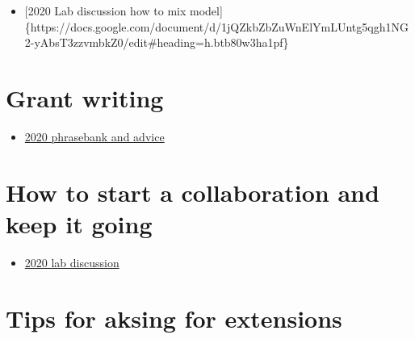 \documentclass[
  letterpaper,
  DIV=11,
  numbers=noendperiod]{scrreprt}
\providecommand{\tightlist}{%
  \setlength{\itemsep}{0pt}\setlength{\parskip}{0pt}}\usepackage{longtable,booktabs,array}
\begin{document}

\begin{itemize}
\tightlist
\item
  {[}2020 Lab discussion how to mix
  model{]}\{https://docs.google.com/document/d/1jQZkbZbZuWnElYmLUntg5qgh1NG2-yAbsT3zzvmbkZ0/edit\#heading=h.btb80w3ha1pf\}
\end{itemize}

\hypertarget{grant-writing}{%
\section*{\texorpdfstring{\textbf{Grant
writing}}{Grant writing}}\label{grant-writing}}


\begin{itemize}
\tightlist
\item
  \href{https://docs.google.com/document/d/10TXWztCiID1-wNTGZ37rvYoIVHbf2kWmQMHoqN6pHQk/edit?pli=1}{2020
  phrasebank and advice}
\end{itemize}

\hypertarget{how-to-start-a-collaboration-and-keep-it-going}{%
\section*{\texorpdfstring{\textbf{How to start a collaboration and keep
it
going}}{How to start a collaboration and keep it going}}\label{how-to-start-a-collaboration-and-keep-it-going}}


\begin{itemize}
\tightlist
\item
  \href{https://docs.google.com/document/d/1mgWle41KPHnlCevE5IB9S1AaWQcYDFm_7riQU7WTfOM/edit}{2020
  lab discussion}
\end{itemize}

\hypertarget{tips-for-aksing-for-extensions}{%
\section*{\texorpdfstring{\textbf{Tips for aksing for
extensions}}{Tips for aksing for extensions}}\label{tips-for-aksing-for-extensions}}
\end{document}
